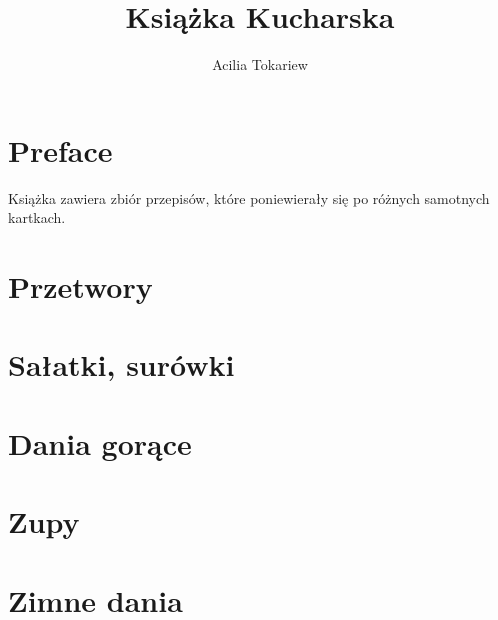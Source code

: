 \documentclass[14pt,twoside,parskip=half*]{scrbook}
\title{Książka Kucharska}
\author{Acilia Tokariew}
\begin{document}
\frontmatter{}
\maketitle{}
\tableofcontents{}
\chapter{Preface}
Książka zawiera zbiór przepisów, które poniewierały się po różnych samotnych
kartkach.

\mainmatter{}

\chapter{Przetwory}

\label{ch:przetwory}

\chapter{Sałatki, surówki}

\label{ch:salatki-surowki}

\chapter{Dania gorące}

\label{ch:dania-gorace}

\chapter{Zupy}

\label{ch:zupy}

\chapter{Zimne dania}

\label{ch:zimne-dania}
\end{document}
